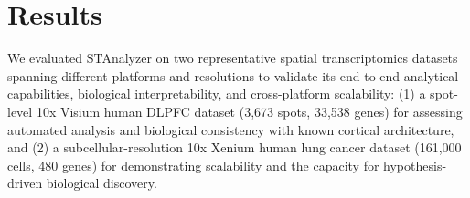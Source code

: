 \documentclass[11pt,a4paper]{article}
\begin{document}


\section{Results}

We evaluated STAnalyzer on two representative spatial transcriptomics datasets spanning different platforms and resolutions to validate its end-to-end analytical capabilities, biological interpretability, and cross-platform scalability: (1) a spot-level 10x Visium human DLPFC dataset (3,673 spots, 33,538 genes) for assessing automated analysis and biological consistency with known cortical architecture, and (2) a subcellular-resolution 10x Xenium human lung cancer dataset (161,000 cells, 480 genes) for demonstrating scalability and the capacity for hypothesis-driven biological discovery.



\end{document}
